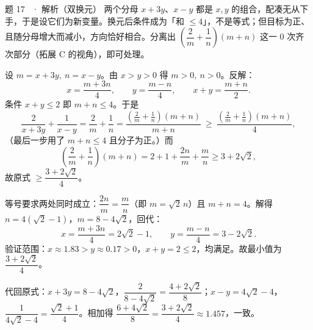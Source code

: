 \begin{solution}{题 17 \starred\starred\ · 解析（双换元）}
\think 两个分母 $x+3y$、$x-y$ 都是 $x,y$ 的组合，配凑无从下手，于是设它们为新变量。换元后条件成为「和 $\le 4$」，不是等式；但目标为正、且随分母增大而减小，方向恰好相合。分离出 $\left(\dfrac2m+\dfrac1n\right)(m+n)$ 这一 0 次齐次部分（拓展 C 的视角），即可处理。

\solve 设 $m=x+3y,\ n=x-y$。由 $x>y>0$ 得 $m>0,\ n>0$。反解：
\[
x=\frac{m+3n}{4},\qquad y=\frac{m-n}{4},\qquad x+y=\frac{m+n}{2}.
\]
条件 $x+y\le 2$ 即 $m+n\le 4$。于是
\[
\frac{2}{x+3y}+\frac{1}{x-y}=\frac2m+\frac1n=\frac{\left(\frac2m+\frac1n\right)(m+n)}{m+n}\ \ge\ \frac{\left(\frac2m+\frac1n\right)(m+n)}{4},
\]
（最后一步用了 $m+n\le 4$ 且分子为正。）而
\[
\left(\frac2m+\frac1n\right)(m+n)=2+1+\frac{2n}{m}+\frac{m}{n}\ge 3+2\sqrt2,
\]
故原式 $\ge\dfrac{3+2\sqrt2}{4}$。

等号要求两处同时成立：$\dfrac{2n}m=\dfrac mn$（即 $m=\sqrt2\,n$）且 $m+n=4$。解得 $n=4(\sqrt2-1)$，$m=8-4\sqrt2$，回代：
\[
x=\frac{m+3n}{4}=2\sqrt2-1,\qquad y=\frac{m-n}{4}=3-2\sqrt2.
\]
验证范围：$x\approx1.83>y\approx0.17>0$，$x+y=2\le 2$，均满足。故最小值为 $\dfrac{3+2\sqrt2}{4}$。

\checkup 代回原式：$x+3y=8-4\sqrt2$，$\dfrac{2}{8-4\sqrt2}=\dfrac{4+2\sqrt2}{8}$；$x-y=4\sqrt2-4$，$\dfrac{1}{4\sqrt2-4}=\dfrac{\sqrt2+1}{4}$。相加得 $\dfrac{6+4\sqrt2}{8}=\dfrac{3+2\sqrt2}{4}\approx1.457$，一致。

\end{solution}

\clearpage
